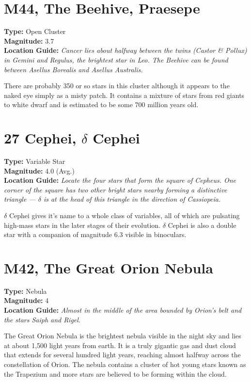 \section{M44, The Beehive, Praesepe}
\textbf{Type:} Open Cluster \\
\textbf{Magnitude:} 3.7 \\ 
\textbf{Location Guide:} \textit{Cancer lies about halfway between the twins (Castor \& Pollux) in Gemini and Regulus, the brightest star in Leo. The Beehive can be found between Asellus Borealis and Asellus Australis.} 

There are probably 350 or so stars in this cluster although it appears to the naked eye simply as a misty patch. It contains a mixture of stars from red giants to white dwarf and is estimated to be some 700 million years old. 

\section{27 Cephei, $\delta$ Cephei} 
\textbf{Type:} Variable Star \\
\textbf{Magnitude:} 4.0 (Avg.) \\ 
\textbf{Location Guide:} \textit{Locate the four stars that form the square of Cepheus. One corner of the square has two other bright stars nearby forming a distinctive triangle --- $\delta$ is at the head of this triangle in the direction of Cassiopeia.} 

$\delta$ Cephei gives it's name to a whole class of variables, all of which are pulsating high-mass stars in the later stages of their evolution. $\delta$ Cephei is also a double star with a companion of magnitude 6.3 visible in binoculars. 

\section{M42, The Great Orion Nebula} 
\textbf{Type:} Nebula \\
\textbf{Magnitude:} 4 \\
\textbf{Location Guide:} \textit{Almost in the middle of the area bounded by Orion's belt and the stars Saiph and Rigel.} 

The Great Orion Nebula is the brightest nebula visible in the night sky and lies at about 1,500 light years from earth. It is a truly gigantic gas and dust cloud that extends for several hundred light years, reaching almost halfway across the constellation of Orion. The nebula contains a cluster of hot young stars known as the Trapezium and more stars are believed to be forming within the cloud. 

